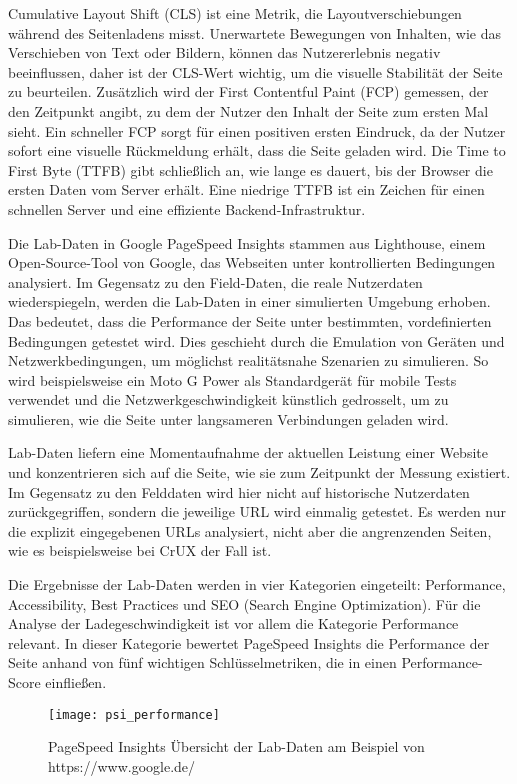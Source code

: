Cumulative Layout Shift (CLS) ist eine Metrik, die Layoutverschiebungen während des Seitenladens misst. Unerwartete Bewegungen von Inhalten, wie das Verschieben von Text oder Bildern, können das Nutzererlebnis negativ beeinflussen, daher ist der CLS-Wert wichtig, um die visuelle Stabilität der Seite zu beurteilen. Zusätzlich wird der First Contentful Paint (FCP) gemessen, der den Zeitpunkt angibt, zu dem der Nutzer den Inhalt der Seite zum ersten Mal sieht. Ein schneller FCP sorgt für einen positiven ersten Eindruck, da der Nutzer sofort eine visuelle Rückmeldung erhält, dass die Seite geladen wird. Die Time to First Byte (TTFB) gibt schließlich an, wie lange es dauert, bis der Browser die ersten Daten vom Server erhält. Eine niedrige TTFB ist ein Zeichen für einen schnellen Server und eine effiziente Backend-Infrastruktur.

Die Lab-Daten in Google PageSpeed Insights stammen aus Lighthouse, einem Open-Source-Tool von Google, das Webseiten unter kontrollierten Bedingungen analysiert. Im Gegensatz zu den Field-Daten, die reale Nutzerdaten wiederspiegeln, werden die Lab-Daten in einer simulierten Umgebung erhoben. Das bedeutet, dass die Performance der Seite unter bestimmten, vordefinierten Bedingungen getestet wird. Dies geschieht durch die Emulation von Geräten und Netzwerkbedingungen, um möglichst realitätsnahe Szenarien zu simulieren. So wird beispielsweise ein Moto G Power als Standardgerät für mobile Tests verwendet und die Netzwerkgeschwindigkeit künstlich gedrosselt, um zu simulieren, wie die Seite unter langsameren Verbindungen geladen wird.

Lab-Daten liefern eine Momentaufnahme der aktuellen Leistung einer Website und konzentrieren sich auf die Seite, wie sie zum Zeitpunkt der Messung existiert. Im Gegensatz zu den Felddaten wird hier nicht auf historische Nutzerdaten zurückgegriffen, sondern die jeweilige URL wird einmalig getestet. Es werden nur die explizit eingegebenen URLs analysiert, nicht aber die angrenzenden Seiten, wie es beispielsweise bei CrUX der Fall ist.

Die Ergebnisse der Lab-Daten werden in vier Kategorien eingeteilt: Performance, Accessibility, Best Practices und SEO (Search Engine Optimization). Für die Analyse der Ladegeschwindigkeit ist vor allem die Kategorie Performance relevant. In dieser Kategorie bewertet PageSpeed Insights die Performance der Seite anhand von fünf wichtigen Schlüsselmetriken, die in einen Performance-Score einfließen.

\begin{figure}
    \centering
    \texttt{[image: psi\_performance]}
    \caption{PageSpeed Insights Übersicht der Lab-Daten am Beispiel von https://www.google.de/}
    \label{fig:psi_performance}
\end{figure}

